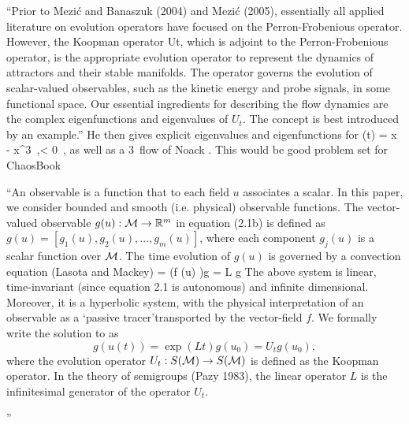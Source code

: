 \begin{description}
``Prior to Mezi\'c and Banaszuk (2004) and Mezi\'c (2005), essentially
all applied literature on evolution operators have focused on the
Perron-Frobenious operator. However, the Koopman operator Ut, which is
adjoint to the Perron-Frobenious operator, is the appropriate evolution
operator to represent the dynamics of attractors and their stable
manifolds. The operator governs the evolution of scalar-valued
observables, such as the kinetic energy and probe signals, in some
functional space. Our essential ingredients for describing the flow
dynamics are the complex eigenfunctions and eigenvalues of $U_t$. The
concept is best introduced by an example.'' He then gives explicit
eigenvalues and eigenfunctions for
\beq
{}(t) = \mu x - x^3 \,,\qquad \mu  < 0
\,,
as well as a 3\dmn\ flow of Noack \etal.
This would be good problem set for ChaosBook

``An observable is a function that to each field $u$ associates a scalar.
In this paper, we consider bounded and smooth (i.e. physical) observable
functions. The vector-valued observable $g(u) : \pS \to \reals^m$ in
equation (2.1b) is defined as $g(u) = [g_1(u), g_2(u), . . . , g_m(u)]$,
where each component $g_j(u)$ is a scalar function over $\pS$. The time
evolution of $g(u)$ is governed by a convection equation (Lasota and
Mackey)
\beq
{}
= (f (u) \cdot \nabla)g = L g
The above system is linear, time-invariant (since equation 2.1 is
autonomous) and infinite dimensional. Moreover, it is a hyperbolic
system, with the physical interpretation of an observable as a `passive
tracer'transported by the vector-field $f$. We formally write the
solution to  as
\[
g(u(t)) = \exp(Lt)g(u_0) = U_t g(u_0),
\]
where the evolution operator $U_t : S({\cal M}) \to S({\cal M})$ is defined as the
Koopman operator. In the theory of semigroups (Pazy 1983),
the linear operator $L$ is the infinitesimal generator of the operator
$U_t$.



''



\end{description}

